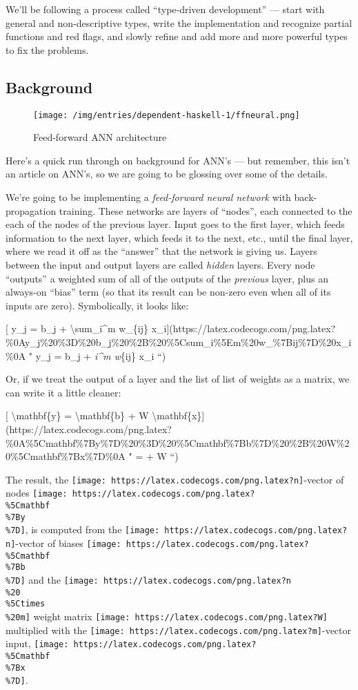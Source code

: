 \documentclass[]{article}
\begin{document}
We'll be following a process called ``type-driven development'' --- start with
general and non-descriptive types, write the implementation and recognize
partial functions and red flags, and slowly refine and add more and more
powerful types to fix the problems.

\subsection{Background}\label{background}

\begin{figure}
\centering
\texttt{[image: /img/entries/dependent-haskell-1/ffneural.png]}
\caption{Feed-forward ANN architecture}
\end{figure}

Here's a quick run through on background for ANN's --- but remember, this isn't
an article on ANN's, so we are going to be glossing over some of the details.

We're going to be implementing a \emph{feed-forward neural network} with
back-propagation training. These networks are layers of ``nodes'', each
connected to the each of the nodes of the previous layer. Input goes to the
first layer, which feeds information to the next layer, which feeds it to the
next, etc., until the final layer, where we read it off as the ``answer'' that
the network is giving us. Layers between the input and output layers are called
\emph{hidden} layers. Every node ``outputs'' a weighted sum of all of the
outputs of the \emph{previous} layer, plus an always-on ``bias'' term (so that
its result can be non-zero even when all of its inputs are zero). Symbolically,
it looks like:

{[} y\_j = b\_j + \textbackslash{}sum\_i\^{}m w\_\{ij\}
x\_i{]}(https://latex.codecogs.com/png.latex?\%0Ay\_j\%20\%3D\%20b\_j\%20\%2B\%20\%5Csum\_i\%5Em\%20w\_\%7Bij\%7D\%20x\_i\%0A
" y\_j = b\_j + \sum\emph{i\^{}m w}\{ij\} x\_i ``)

Or, if we treat the output of a layer and the list of list of weights as a
matrix, we can write it a little cleaner:

{[} \textbackslash{}mathbf\{y\} = \textbackslash{}mathbf\{b\} + W
\textbackslash{}mathbf\{x\}{]}(https://latex.codecogs.com/png.latex?\%0A\%5Cmathbf\%7By\%7D\%20\%3D\%20\%5Cmathbf\%7Bb\%7D\%20\%2B\%20W\%20\%5Cmathbf\%7Bx\%7D\%0A
"  =  + W  ``)

The result, the \texttt{[image: https://latex.codecogs.com/png.latex?n]}-vector
of nodes
\texttt{[image: https://latex.codecogs.com/png.latex?\\\%5Cmathbf\\\%7By\\\%7D]}, is
computed from the
\texttt{[image: https://latex.codecogs.com/png.latex?n]}-vector of biases
\texttt{[image: https://latex.codecogs.com/png.latex?\\\%5Cmathbf\\\%7Bb\\\%7D]} and
the \texttt{[image: https://latex.codecogs.com/png.latex?n\\\%20\\\%5Ctimes\\\%20m]}
weight matrix \texttt{[image: https://latex.codecogs.com/png.latex?W]}
multiplied with the
\texttt{[image: https://latex.codecogs.com/png.latex?m]}-vector input,
\texttt{[image: https://latex.codecogs.com/png.latex?\\\%5Cmathbf\\\%7Bx\\\%7D]}.
\end{document}
